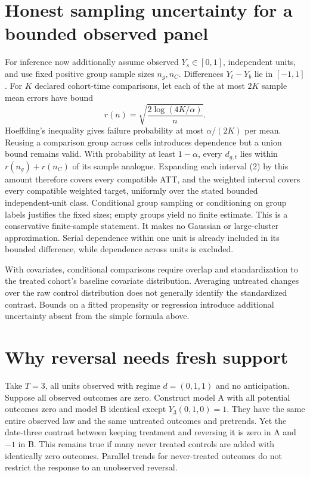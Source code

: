 \documentclass[11pt]{article}
\theoremstyle{definition}
\begin{document}
\section*{Honest sampling uncertainty for a bounded observed panel}
For inference now additionally assume observed $Y_s\in[0,1]$, independent units,
and use fixed positive group sample sizes $n_g,n_C$. Differences $Y_t-Y_b$
lie in $[-1,1]$. For $K$ declared cohort-time comparisons, let each of the
at most $2K$ sample mean errors have bound
\[
 r(n)=\sqrt{\frac{2\log(4K/\alpha)}{n}}.
\]
Hoeffding's inequality gives failure probability at most $\alpha/(2K)$ per
mean. Reusing a comparison group across cells introduces dependence but a union
bound remains valid. With probability at least $1-\alpha$, every $d_{g,t}$ lies
within $r(n_g)+r(n_C)$ of its sample analogue. Expanding each interval (2) by
this amount therefore covers every compatible ATT, and the weighted interval
covers every compatible weighted target, uniformly over the stated bounded
independent-unit class. Conditional group sampling or conditioning on group
labels justifies the fixed sizes; empty groups yield no finite estimate.
This is a conservative finite-sample statement. It makes no Gaussian or
large-cluster approximation. Serial dependence within one unit is already
included in its bounded difference, while dependence across units is excluded.

With covariates, conditional comparisons require overlap and standardization
to the treated cohort's baseline covariate distribution. Averaging untreated
changes over the raw control distribution does not generally identify the
standardized contrast. Bounds on a fitted propensity or regression introduce
additional uncertainty absent from the simple formula above.

\section*{Why reversal needs fresh support}
Take $T=3$, all units observed with regime $d=(0,1,1)$ and no anticipation.
Suppose all observed outcomes are zero. Construct model A with all potential
outcomes zero and model B identical except
$Y_3(0,1,0)=1$. They have the same entire observed law and the same untreated
outcomes and pretrends. Yet the date-three contrast between keeping treatment
and reversing it is zero in A and $-1$ in B. This remains true if many never
treated controls are added with identically zero outcomes. Parallel trends for
never-treated outcomes do not restrict the response to an unobserved reversal.
\end{document}
